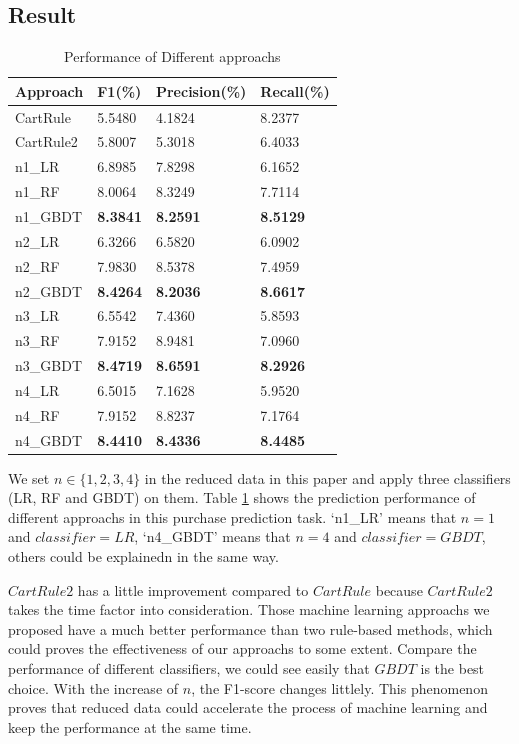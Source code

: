 \documentclass{llncs}
\begin{document}
\subsection{Result}
\begin{table}[htbp]
	\normalsize
	\centering
	\caption{Performance of Different approachs}
	\begin{tabular}{|p{56pt}|p{48pt}|p{48pt}|p{48pt}|}
		\hline
		Approach & F1(\%) & Precision(\%) & Recall(\%) \\
		\hline
		CartRule & 5.5480 & 4.1824 & 8.2377 \\
		CartRule2 & 5.8007 & 5.3018 & 6.4033 \\
		\hline
		n1\_LR & 6.8985 & 7.8298 & 6.1652 \\
		n1\_RF & 8.0064 & 8.3249 & 7.7114 \\
		n1\_GBDT & \textbf{8.3841} & \textbf{8.2591} & \textbf{8.5129} \\
		\hline
		n2\_LR & 6.3266 & 6.5820 & 6.0902 \\
		n2\_RF & 7.9830 & 8.5378 & 7.4959 \\
		n2\_GBDT & \textbf{8.4264} & \textbf{8.2036} & \textbf{8.6617} \\
		\hline
		n3\_LR & 6.5542 & 7.4360 & 5.8593 \\
		n3\_RF & 7.9152 & 8.9481 & 7.0960 \\
		n3\_GBDT & \textbf{8.4719} & \textbf{8.6591} & \textbf{8.2926} \\
		\hline
		n4\_LR & 6.5015 & 7.1628 & 5.9520 \\
		n4\_RF & 7.9152 & 8.8237 & 7.1764 \\
		n4\_GBDT & \textbf{8.4410} & \textbf{8.4336} & \textbf{8.4485} \\
		\hline
	\end{tabular}
	\label{tab:score}
\end{table}

We set $n \in \{ 1, 2, 3, 4\}$ in the reduced data in this paper
and apply three classifiers (LR, RF and GBDT) on them.
Table \ref{tab:score} shows the prediction performance of different approachs
in this purchase prediction task.
`n1\_LR' means that $n = 1$ and $classifier = LR$,
`n4\_GBDT' means that $n = 4$ and $classifier = GBDT$,
others could be explainedn in the same way.

$CartRule2$ has a little improvement compared to $CartRule$
because $CartRule2$ takes the time factor into consideration.
Those machine learning approachs we proposed have a much better performance
than two rule-based methods, which could proves the effectiveness of our approachs to some extent.
Compare the performance of different classifiers,
we could see easily that $GBDT$ is the best choice.
With the increase of $n$, the F1-score changes littlely.
This phenomenon proves that reduced data could accelerate
the process of machine learning and keep the performance at the same time.
\end{document}
